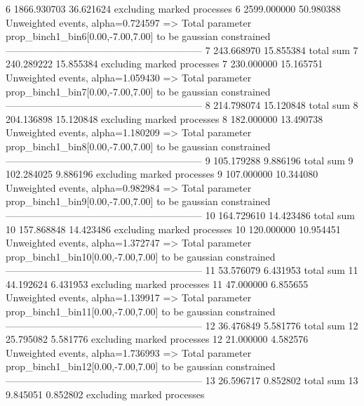 6          1866.930703     36.621624       excluding marked processes    
6          2599.000000     50.980388       Unweighted events, alpha=0.724597
  => Total parameter prop_binch1_bin6[0.00,-7.00,7.00] to be gaussian constrained
------------------------------------------------------------
7          243.668970      15.855384       total sum                     
7          240.289222      15.855384       excluding marked processes    
7          230.000000      15.165751       Unweighted events, alpha=1.059430
  => Total parameter prop_binch1_bin7[0.00,-7.00,7.00] to be gaussian constrained
------------------------------------------------------------
8          214.798074      15.120848       total sum                     
8          204.136898      15.120848       excluding marked processes    
8          182.000000      13.490738       Unweighted events, alpha=1.180209
  => Total parameter prop_binch1_bin8[0.00,-7.00,7.00] to be gaussian constrained
------------------------------------------------------------
9          105.179288      9.886196        total sum                     
9          102.284025      9.886196        excluding marked processes    
9          107.000000      10.344080       Unweighted events, alpha=0.982984
  => Total parameter prop_binch1_bin9[0.00,-7.00,7.00] to be gaussian constrained
------------------------------------------------------------
10         164.729610      14.423486       total sum                     
10         157.868848      14.423486       excluding marked processes    
10         120.000000      10.954451       Unweighted events, alpha=1.372747
  => Total parameter prop_binch1_bin10[0.00,-7.00,7.00] to be gaussian constrained
------------------------------------------------------------
11         53.576079       6.431953        total sum                     
11         44.192624       6.431953        excluding marked processes    
11         47.000000       6.855655        Unweighted events, alpha=1.139917
  => Total parameter prop_binch1_bin11[0.00,-7.00,7.00] to be gaussian constrained
------------------------------------------------------------
12         36.476849       5.581776        total sum                     
12         25.795082       5.581776        excluding marked processes    
12         21.000000       4.582576        Unweighted events, alpha=1.736993
  => Total parameter prop_binch1_bin12[0.00,-7.00,7.00] to be gaussian constrained
------------------------------------------------------------
13         26.596717       0.852802        total sum                     
13         9.845051        0.852802        excluding marked processes    
